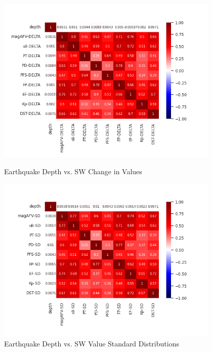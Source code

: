 \documentclass[12pt]{article}
\begin{document}
\begin{figure}
\centering
  \includegraphics[width=0.95\textwidth]{corr-depth-DELTA.png}
  \caption{Earthquake Depth vs. SW Change in Values}

  \includegraphics[width=0.95\textwidth]{corr-depth-SD.png}
  \caption{Earthquake Depth vs. SW Value Standard Distributions}

\end{figure}

\newpage
\end{document}
